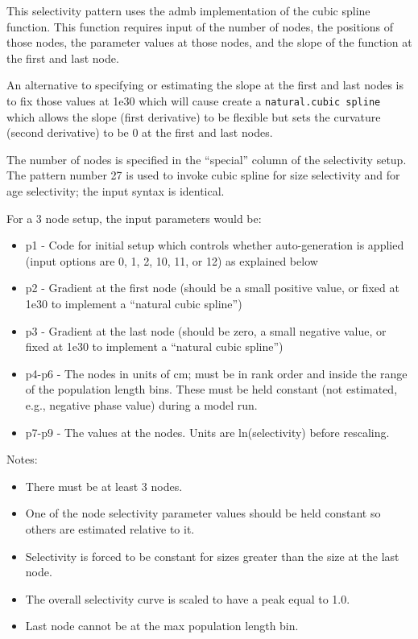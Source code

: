 \hypertarget{cubic-spline}{}
This selectivity pattern uses the \gls{admb} implementation of the cubic spline
function. This function requires input of the number of nodes, the positions
of those nodes, the parameter values at those nodes, and the slope of the
function at the first and last node.

An alternative to specifying or estimating the slope at the first and last
nodes is to fix those values at 1e30 which will cause create a \texttt{natural.cubic spline} 
which allows the slope (first derivative) to be flexible but
sets the curvature (second derivative) to be 0 at the first and last nodes.

The number of nodes is specified in the ``special'' column of the selectivity
setup. The pattern number 27 is used to invoke cubic spline for size
selectivity and for age selectivity; the input syntax is identical.
	
For a 3 node setup, the input parameters would be:
	\begin{itemize}
		\item p1 - Code for initial setup which controls whether auto-generation is applied (input options are 0, 1, 2, 10, 11, or 12) as explained below
		\item p2 - Gradient at the first node (should be a small positive value, or fixed at 1e30 to implement a ``natural cubic spline'')
		\item p3 - Gradient at the last node (should be zero, a small negative value, or fixed at 1e30 to implement a ``natural cubic spline'')
		\item p4-p6 - The nodes in units of cm; must be in rank order and inside the range of the population length bins. These must be held constant (not estimated, e.g., negative phase value) during a model run.
		\item p7-p9 - The values at the nodes. Units are ln(selectivity) before rescaling.
	\end{itemize}

Notes:
	\begin{itemize}
		\item There must be at least 3 nodes.
		\item One of the node selectivity parameter values should be held constant so others are estimated relative to it.
		\item Selectivity is forced to be constant for sizes greater than the size at the last node.
		\item The overall selectivity curve is scaled to have a peak equal to 1.0.
		\item Last node cannot be at the max population length bin.
	\end{itemize}
	
